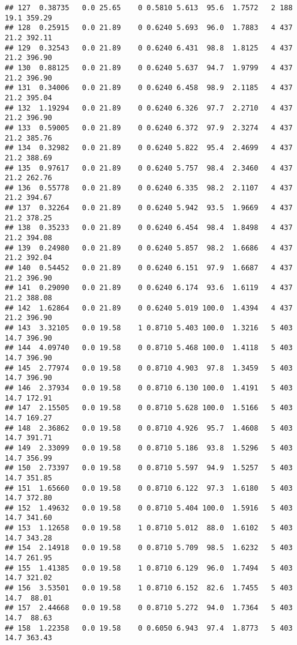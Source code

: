 \documentclass[
]{article}
\begin{document}
\begin{verbatim}
## 127  0.38735   0.0 25.65    0 0.5810 5.613  95.6  1.7572   2 188    19.1 359.29
## 128  0.25915   0.0 21.89    0 0.6240 5.693  96.0  1.7883   4 437    21.2 392.11
## 129  0.32543   0.0 21.89    0 0.6240 6.431  98.8  1.8125   4 437    21.2 396.90
## 130  0.88125   0.0 21.89    0 0.6240 5.637  94.7  1.9799   4 437    21.2 396.90
## 131  0.34006   0.0 21.89    0 0.6240 6.458  98.9  2.1185   4 437    21.2 395.04
## 132  1.19294   0.0 21.89    0 0.6240 6.326  97.7  2.2710   4 437    21.2 396.90
## 133  0.59005   0.0 21.89    0 0.6240 6.372  97.9  2.3274   4 437    21.2 385.76
## 134  0.32982   0.0 21.89    0 0.6240 5.822  95.4  2.4699   4 437    21.2 388.69
## 135  0.97617   0.0 21.89    0 0.6240 5.757  98.4  2.3460   4 437    21.2 262.76
## 136  0.55778   0.0 21.89    0 0.6240 6.335  98.2  2.1107   4 437    21.2 394.67
## 137  0.32264   0.0 21.89    0 0.6240 5.942  93.5  1.9669   4 437    21.2 378.25
## 138  0.35233   0.0 21.89    0 0.6240 6.454  98.4  1.8498   4 437    21.2 394.08
## 139  0.24980   0.0 21.89    0 0.6240 5.857  98.2  1.6686   4 437    21.2 392.04
## 140  0.54452   0.0 21.89    0 0.6240 6.151  97.9  1.6687   4 437    21.2 396.90
## 141  0.29090   0.0 21.89    0 0.6240 6.174  93.6  1.6119   4 437    21.2 388.08
## 142  1.62864   0.0 21.89    0 0.6240 5.019 100.0  1.4394   4 437    21.2 396.90
## 143  3.32105   0.0 19.58    1 0.8710 5.403 100.0  1.3216   5 403    14.7 396.90
## 144  4.09740   0.0 19.58    0 0.8710 5.468 100.0  1.4118   5 403    14.7 396.90
## 145  2.77974   0.0 19.58    0 0.8710 4.903  97.8  1.3459   5 403    14.7 396.90
## 146  2.37934   0.0 19.58    0 0.8710 6.130 100.0  1.4191   5 403    14.7 172.91
## 147  2.15505   0.0 19.58    0 0.8710 5.628 100.0  1.5166   5 403    14.7 169.27
## 148  2.36862   0.0 19.58    0 0.8710 4.926  95.7  1.4608   5 403    14.7 391.71
## 149  2.33099   0.0 19.58    0 0.8710 5.186  93.8  1.5296   5 403    14.7 356.99
## 150  2.73397   0.0 19.58    0 0.8710 5.597  94.9  1.5257   5 403    14.7 351.85
## 151  1.65660   0.0 19.58    0 0.8710 6.122  97.3  1.6180   5 403    14.7 372.80
## 152  1.49632   0.0 19.58    0 0.8710 5.404 100.0  1.5916   5 403    14.7 341.60
## 153  1.12658   0.0 19.58    1 0.8710 5.012  88.0  1.6102   5 403    14.7 343.28
## 154  2.14918   0.0 19.58    0 0.8710 5.709  98.5  1.6232   5 403    14.7 261.95
## 155  1.41385   0.0 19.58    1 0.8710 6.129  96.0  1.7494   5 403    14.7 321.02
## 156  3.53501   0.0 19.58    1 0.8710 6.152  82.6  1.7455   5 403    14.7  88.01
## 157  2.44668   0.0 19.58    0 0.8710 5.272  94.0  1.7364   5 403    14.7  88.63
## 158  1.22358   0.0 19.58    0 0.6050 6.943  97.4  1.8773   5 403    14.7 363.43

\end{verbatim}
\end{document}
